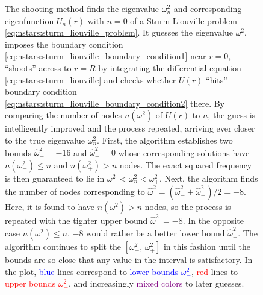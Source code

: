 \begin{figure}
\caption{\label{fig:nstars:shooting_convergence}%
	The shooting method finds the eigenvalue $\omega_n^2$ and corresponding eigenfunction $U_n(r)$ with $n=0$ of a Sturm-Liouville problem \eqref{eq:nstars:sturm_liouville_problem}.
	It guesses the eigenvalue $\omega^2$, imposes the boundary condition \eqref{eq:nstars:sturm_liouville_boundary_condition1} near $r = 0$, ``shoots'' across to $r=R$ by integrating the differential equation \eqref{eq:nstars:sturm_liouville} and checks whether $U(r)$ ``hits'' boundary condition \eqref{eq:nstars:sturm_liouville_boundary_condition2} there.
	By comparing the number of nodes $n(\omega^2)$ of $U(r)$ to $n$, the guess is intelligently improved and the process repeated, arriving ever closer to the true eigenvalue $\omega_n^2$.
	First, the algorithm establishes two bounds $\hat{\omega}_-^2 = -16$ and $\hat{\omega}_+^2 = 0$ whose corresponding solutions have $n(\omega_-^2) \leq n$ and $n(\omega_+^2) > n$ nodes.
	The exact squared frequency is then guaranteed to lie in $\omega_-^2 < \omega_n^2 < \omega_+^2$.
	Next, the algorithm finds the number of nodes corresponding to $\hat{\omega}^2 = (\hat{\omega}_-^2 + \hat{\omega}_+^2) / 2 = -8$.
	Here, it is found to have $n(\omega^2) > n$ nodes, so the process is repeated with the tighter upper bound $\hat{\omega}_+^2 = -8$.
	In the opposite case $n(\omega^2) \leq n$, $-8$ would rather be a better lower bound $\hat{\omega}_-^2$.
	The algorithm continues to split the $[\omega_-^2, \, \omega_+^2]$ in this fashion until the bounds are so close that any value in the interval is satisfactory.
	In the plot, \textcolor{blue}{blue} lines correspond to \textcolor{blue}{lower bounds $\omega_-^2$}, \textcolor{red}{red} lines to \textcolor{red}{upper bounds $\omega_+^2$}, and increasingly \textcolor{purple}{mixed colors} to later guesses.
}
\end{figure}

